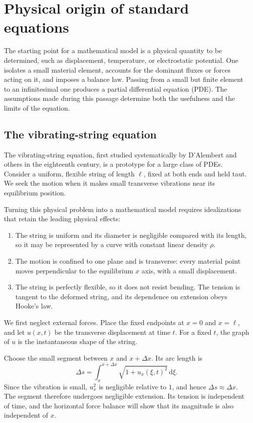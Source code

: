 \section{Physical origin of standard equations}

The starting point for a mathematical model is a physical quantity to be determined, such as displacement, temperature, or electrostatic potential. One isolates a small material element, accounts for the dominant fluxes or forces acting on it, and imposes a balance law. Passing from a small but finite element to an infinitesimal one produces a partial differential equation (PDE). The assumptions made during this passage determine both the usefulness and the limits of the equation.

\subsection{The vibrating-string equation}

The vibrating-string equation, first studied systematically by D'Alembert and others in the eighteenth century, is a prototype for a large class of PDEs. Consider a uniform, flexible string of length $\ell$, fixed at both ends and held taut. We seek the motion when it makes small transverse vibrations near its equilibrium position.

Turning this physical problem into a mathematical model requires idealizations that retain the leading physical effects:
\begin{enumerate}
\item The string is uniform and its diameter is negligible compared with its length, so it may be represented by a curve with constant linear density $\rho$.
\item The motion is confined to one plane and is transverse: every material point moves perpendicular to the equilibrium $x$ axis, with a small displacement.
\item The string is perfectly flexible, so it does not resist bending. The tension is tangent to the deformed string, and its dependence on extension obeys Hooke's law.
\end{enumerate}
We first neglect external forces. Place the fixed endpoints at $x=0$ and $x=\ell$, and let $u(x,t)$ be the transverse displacement at time $t$. For a fixed $t$, the graph of $u$ is the instantaneous shape of the string.

Choose the small segment between $x$ and $x+\Delta x$. Its arc length is
\begin{equation}
\Delta s=\int_x^{x+\Delta x}\sqrt{1+u_x(\xi,t)^2}\,\mathrm{d}\xi.
\end{equation}
Since the vibration is small, $u_x^2$ is negligible relative to $1$, and hence $\Delta s\approx\Delta x$. The segment therefore undergoes negligible extension. Its tension is independent of time, and the horizontal force balance will show that its magnitude is also independent of $x$.

